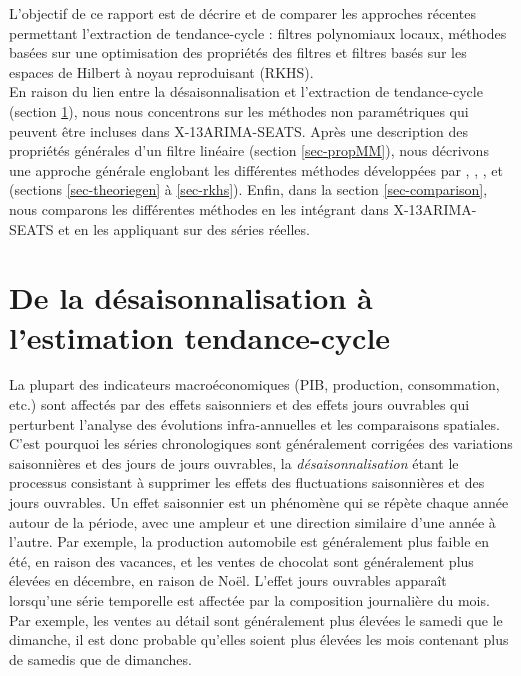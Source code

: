 \documentclass[
  11pt,
  french,
  a4paper]{article}
\newcommand\1{\mathds{1}}
\begin{document}
L'objectif de ce rapport est de décrire et de comparer les approches récentes permettant l'extraction de tendance-cycle : filtres polynomiaux locaux, méthodes basées sur une optimisation des propriétés des filtres et filtres basés sur les espaces de Hilbert à noyau reproduisant (RKHS).\\
En raison du lien entre la désaisonnalisation et l'extraction de tendance-cycle (section \ref{sec-SAtoTCE}), nous nous concentrons sur les méthodes non paramétriques qui peuvent être incluses dans X-13ARIMA-SEATS.
Après une description des propriétés générales d'un filtre linéaire (section \ref{sec-propMM}), nous décrivons une approche générale englobant les différentes méthodes développées par \textcite{proietti2008}, \textcite{GrayThomson1996}, \textcite{ch15HBSA}, \textcite{trilemmaWMR2019} et \textcite{dagumbianconcini2008} (sections \ref{sec-theoriegen} à \ref{sec-rkhs}).
Enfin, dans la section \ref{sec-comparison}, nous comparons les différentes méthodes en les intégrant dans X-13ARIMA-SEATS et en les appliquant sur des séries réelles.

\newpage

\hypertarget{sec-SAtoTCE}{%
\section{De la désaisonnalisation à l'estimation tendance-cycle}\label{sec-SAtoTCE}}

La plupart des indicateurs macroéconomiques (PIB, production, consommation, etc.) sont affectés par des effets saisonniers et des effets jours ouvrables qui perturbent l'analyse des évolutions infra-annuelles et les comparaisons spatiales.
C'est pourquoi les séries chronologiques sont généralement corrigées des variations saisonnières et des jours de jours ouvrables, la \emph{désaisonnalisation} étant le processus consistant à supprimer les effets des fluctuations saisonnières et des jours ouvrables.
Un effet saisonnier est un phénomène qui se répète chaque année autour de la période, avec une ampleur et une direction similaire d'une année à l'autre.
Par exemple, la production automobile est généralement plus faible en été, en raison des vacances, et les ventes de chocolat sont généralement plus élevées en décembre, en raison de Noël.
L'effet jours ouvrables apparaît lorsqu'une série temporelle est affectée par la composition journalière du mois.
Par exemple, les ventes au détail sont généralement plus élevées le samedi que le dimanche, il est donc probable qu'elles soient plus élevées les mois contenant plus de samedis que de dimanches.
\end{document}
